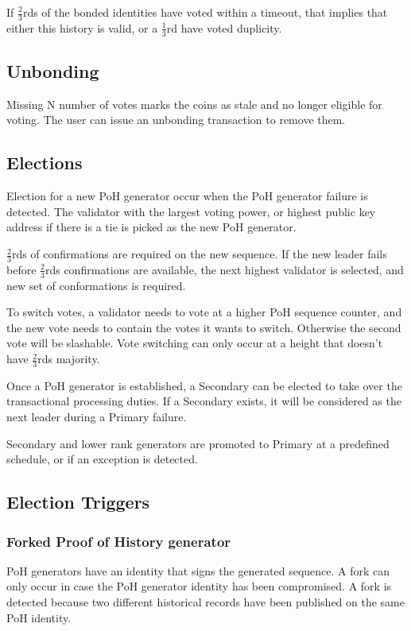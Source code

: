 \documentclass[12pt]{article}
\begin{document}
If \(\frac{2}{3}\)rds of the bonded identities have voted within a timeout, that implies that either this history is valid, or a \(\frac{1}{3}\)rd have voted duplicity.

\subsection{Unbonding}

Missing N number of votes marks the coins as stale and no longer eligible for voting.  The user can issue an unbonding transaction to remove them.
\subsection{Elections}\label{subsec:elections}
Election for a new PoH generator occur when the PoH generator failure is detected.  The validator with the largest voting power, or highest public key address if there is a tie is picked as the new PoH generator.

\(\frac{2}{3}\)rds of confirmations are required on the new sequence.  If the new leader fails before \(\frac{2}{3}\)rds confirmations are available, the next highest validator is selected, and new set of conformations is required.

To switch votes, a validator needs to vote at a higher PoH sequence counter, and the new vote needs to contain the votes it wants to switch.  Otherwise the second vote will be slashable. Vote switching can only occur at a height that doesn’t have \(\frac{2}{3}\)rds majority.

Once a PoH generator is established, a Secondary can be elected to take over the transactional processing duties.  If a Secondary exists, it will be considered as the next leader during a Primary failure.

Secondary and lower rank generators are promoted to Primary at a predefined schedule, or if an exception is detected.
\subsection{Election Triggers}
\subsubsection{Forked Proof of History generator}

PoH generators have an identity that signs the generated sequence.  A fork can only occur in case the PoH generator identity has been compromised.  A fork is detected because two different historical records have been published on the same PoH identity.
\end{document}
